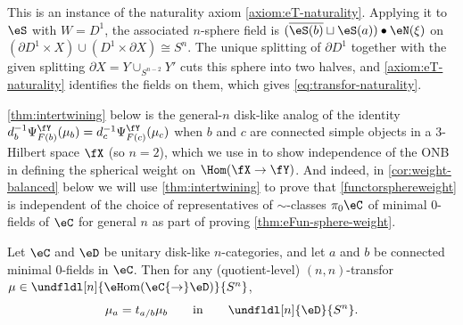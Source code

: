 \documentclass[12pt,reqno]{amsart}
\newcommand{\eHom}{{\eH}\mathrm{om}}
\newcommand{\C}{\eC}
\newcommand{\D}{\eD}
\newcommand{\blt}{\bullet}
\newcommand{\fcj}[1]{\overline{#1}}
\renewcommand{\amalg}{\sqcup}
\begin{document}
\begin{pf}
This is an instance of the naturality axiom \ref{axiom:eT-naturality}. Applying it to $\eS$ with $W=D^1$, the associated $n$-sphere field is $(\fcj{\eS(b)}\amalg\eS(a))\blt\eN(\xi)$ on $(\partial D^1\times X)\cup(D^1\times\partial X)\cong S^n$. The unique splitting of $\partial D^1$ together with the given splitting $\partial X=Y\cup_{S^{n-2}}Y'$ cuts this sphere into two halves, and \ref{axiom:eT-naturality} identifies the fields on them, which gives \eqref{eq:transfor-naturality}.
\end{pf}

\begin{remark}
\cref{thm:intertwining} below is the general-$n$ disk-like analog of the identity
$d_b^{-1}\Psi^{\fY}_{F(b)}(\mu_b)=d_c^{-1}\Psi^{\fY}_{F(c)}(\mu_c)$ when $b$ and $c$ are connected simple objects in a $3$-Hilbert space $\fX$ (so $n=2$), which we use in \cite[Step 1 of Lem. 5.2]{bases} to show independence of the ONB in defining the spherical weight on
$\Hom(\fX\to\fY)$. And indeed, in \cref{cor:weight-balanced} below we will use \cref{thm:intertwining} to prove that \eqref{functorsphereweight} is independent of the choice of representatives of $\sim$-classes $\pi_0\C$ of minimal 0-fields of $\C$ for general $n$ as part of proving \cref{thm:eFun-sphere-weight}.
\end{remark}

\begin{lemma}
\label{thm:intertwining}
Let $\C$ and $\D$ be unitary disk-like $n$-categories, and let $a$ and $b$ be connected minimal 0-fields in $\C$.
Then for any (quotient-level) $(n,n)$-transfor $\mu\in\undfldl[n]{\eHom(\C{\to}\D)}{S^n}$,
\[
\mu_a=t_{a/b}\mu_b\qquad\text{in}\qquad \undfldl[n]{\D}{S^n}.
\]
\end{lemma}
\end{document}
